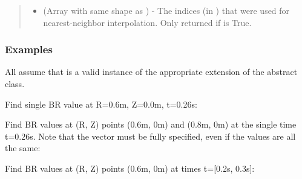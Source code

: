 \documentclass[letterpaper,10pt,english]{sphinxmanual}
\begin{document}
\begin{fulllineitems}
\begin{fulllineitems}
\begin{quote}
\begin{description}
\begin{itemize}
\item {} 
 (Array with same shape as ) - The indices
(in ) that were used for
nearest-neighbor interpolation. Only returned if  is
True.

\end{itemize}


\end{description}\end{quote}
\subsubsection*{Examples}

All assume that  is a valid instance of the appropriate
extension of the {\hyperref[\detokenize{eqtools:eqtools.core.Equilibrium}]{}} abstract class.

Find single BR value at R=0.6m, Z=0.0m, t=0.26s:

\begin{sphinxVerbatim}[commandchars=\\\{\}]
    
\end{sphinxVerbatim}

Find BR values at (R, Z) points (0.6m, 0m) and (0.8m, 0m) at the
single time t=0.26s. Note that the  vector must be fully
specified, even if the values are all the same:

\begin{sphinxVerbatim}[commandchars=\\\{\}]
  \PYG{p}{[} \PYG{p}{]} \PYG{p}{[} \PYG{p}{]} 
\end{sphinxVerbatim}

Find BR values at (R, Z) points (0.6m, 0m) at times t={[}0.2s, 0.3s{]}:

\begin{sphinxVerbatim}[commandchars=\\\{\}]
    \PYG{p}{[} \PYG{p}{]}
\end{sphinxVerbatim}


\end{fulllineitems}
\end{fulllineitems}
\end{document}
